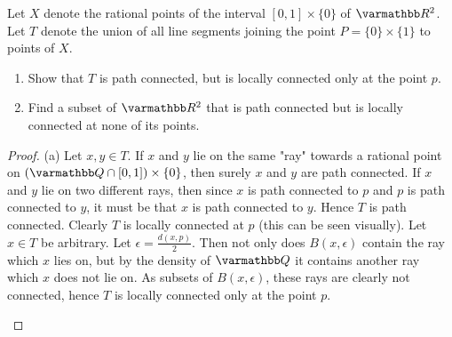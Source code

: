 \documentclass[10pt,oneside,openany]{memoir}
\begin{document}
\begin{exercise}[manual-num={5}]
Let $X$ denote the rational points of the interval $[0,1] \times \{0\}$ of $\bfR^2$. Let $T$ denote the union of all line segments joining the point $P = \{0\} \times \{1\}$ to points of $X$.
\begin{enumerate}[label = (\alph*),itemsep=1pt,topsep=3pt]
    \item Show that $T$ is path connected, but is locally connected only at the point $p$.
    \item Find a subset of $\bfR^2$ that is path connected but is locally connected at none of its points.
\end{enumerate}
\end{exercise}
    \begin{proof}
        (a) Let $x,y \in T$. If $x$ and $y$ lie on the same "ray" towards a rational point on $(\bfQ \cap [0,1]) \times \{0\}$, then surely $x$ and $y$ are path connected. If $x$ and $y$ lie on two different rays, then since $x$ is path connected to $p$ and $p$ is path connected to $y$, it must be that $x$ is path connected to $y$. Hence $T$ is path connected. Clearly $T$ is locally connected at $p$ (this can be seen visually). Let $x \in T$ be arbitrary. Let $\epsilon = \frac{d(x,p)}{2}$. Then not only does $B(x,\epsilon)$ contain the ray which $x$ lies on, but by the density of $\bfQ$ it contains another ray which $x$ does not lie on. As subsets of $B(x,\epsilon)$, these rays are clearly not connected, hence $T$ is locally connected only at the point $p$.
            \begin{center}
\end{center}
\end{proof}
\end{document}
